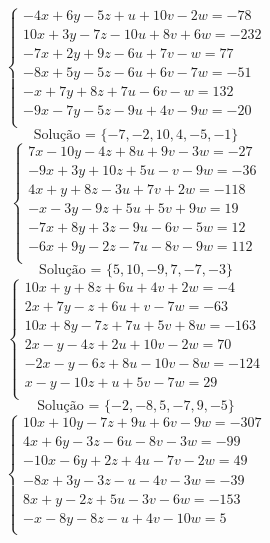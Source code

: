 \documentclass[12pt,oneside,a4paper]{article}
\begin{document}
\vspace{\baselineskip}
\begin{equation*}
\begin{cases}
-4x+6y-5z+u+10v-2w=-78 \\
10x+3y-7z-10u+8v+6w=-232 \\
-7x+2y+9z-6u+7v-w=77 \\
-8x+5y-5z-6u+6v-7w=-51 \\
-x+7y+8z+7u-6v-w=132 \\
-9x-7y-5z-9u+4v-9w=-20 \\
\end{cases}
\end{equation*}
\begin{equation*}
\text{Solução = }\{-7,-2,10,4,-5,-1\}
\end{equation*}
\vspace{\baselineskip}
\begin{equation*}
\begin{cases}
7x-10y-4z+8u+9v-3w=-27 \\
-9x+3y+10z+5u-v-9w=-36 \\
4x+y+8z-3u+7v+2w=-118 \\
-x-3y-9z+5u+5v+9w=19 \\
-7x+8y+3z-9u-6v-5w=12 \\
-6x+9y-2z-7u-8v-9w=112 \\
\end{cases}
\end{equation*}
\begin{equation*}
\text{Solução = }\{5,10,-9,7,-7,-3\}
\end{equation*}
\vspace{\baselineskip}
\begin{equation*}
\begin{cases}
10x+y+8z+6u+4v+2w=-4 \\
2x+7y-z+6u+v-7w=-63 \\
10x+8y-7z+7u+5v+8w=-163 \\
2x-y-4z+2u+10v-2w=70 \\
-2x-y-6z+8u-10v-8w=-124 \\
x-y-10z+u+5v-7w=29 \\
\end{cases}
\end{equation*}
\begin{equation*}
\text{Solução = }\{-2,-8,5,-7,9,-5\}
\end{equation*}
\vspace{\baselineskip}
\begin{equation*}
\begin{cases}
10x+10y-7z+9u+6v-9w=-307 \\
4x+6y-3z-6u-8v-3w=-99 \\
-10x-6y+2z+4u-7v-2w=49 \\
-8x+3y-3z-u-4v-3w=-39 \\
8x+y-2z+5u-3v-6w=-153 \\
-x-8y-8z-u+4v-10w=5 \\
\end{cases}
\end{equation*}
\end{document}
